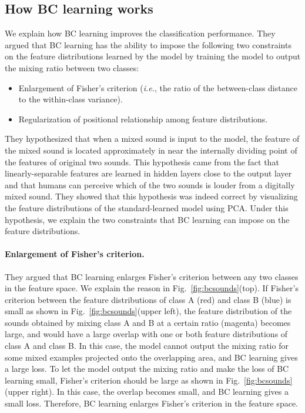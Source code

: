 \documentclass[10pt,twocolumn,letterpaper]{article}
\begin{document}
\subsection{How BC learning works}
We explain how BC learning improves the classification performance. They argued that BC learning has the ability to impose the following two constraints on the feature distributions learned by the model by training the model to output the mixing ratio between two classes:
\begin{itemize}
\vspace{-1mm}
\setlength{\itemsep}{0cm} 
 \item{Enlargement of Fisher's criterion \cite{fisher1936use} ({\it i.e.}, the ratio of the between-class distance to the within-class variance).} 
 \item{Regularization of positional relationship among feature distributions.} 
\end{itemize}

They hypothesized that when a mixed sound is input to the model, the feature of the mixed sound is located approximately in near the internally dividing point of the features of original two sounds. This hypothesis came from the fact that linearly-separable features are learned in hidden layers close to the output layer \cite{an2015can} and that humans can perceive which of the two sounds is louder from a digitally mixed sound. They showed that this hypothesis was indeed correct by visualizing the feature distributions of the standard-learned model using PCA. Under this hypothesis, we explain the two constraints that BC learning can impose on the feature distributions.



\paragraph{Enlargement of Fisher's criterion.}\label{fisher}
They argued that BC learning enlarges Fisher's criterion \cite{fisher1936use} between any two classes in the feature space. We explain the reason in Fig.~\ref{fig:bcsounds}(top). If Fisher's criterion between the feature distributions of class A (red) and class B (blue) is small as shown in Fig.~\ref{fig:bcsounds}(upper left), the feature distribution of the sounds obtained by mixing class A and B at a certain ratio (magenta) becomes large, and would have a large overlap with one or both feature distributions of class A and class B. In this case, the model cannot output the mixing ratio for some mixed examples projected onto the overlapping area, and BC learning gives a large loss. To let the model output the mixing ratio and make the loss of BC learning small, Fisher's criterion should be large as shown in Fig.~\ref{fig:bcsounds}(upper right). In this case, the overlap becomes small, and BC learning gives a small loss. Therefore, BC learning enlarges Fisher's criterion in the feature space.
\end{document}

